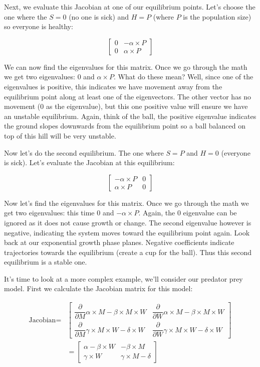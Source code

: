 \documentclass[]{memoir}
\begin{document}
Next, we evaluate this Jacobian at one of our equilibrium points. Let's
choose the one where the $S=0$ (no one is sick) and $H=P$ (where $P$ is
the population size) so everyone is healthy:

\[
\begin{bmatrix}
0 & -\alpha \times P \\
0 & \alpha \times P
\end{bmatrix}
\]

We can now find the eigenvalues for this matrix. Once we go through the
math we get two eigenvalues: 0 and $\alpha \times P$. What do these
mean? Well, since one of the eigenvalues is positive, this indicates we
have movement away from the equilibrium point along at least one of the
eigenvectors. The other vector has no movement (0 as the eigenvalue),
but this one positive value will ensure we have an unstable equilibrium.
Again, think of the ball, the positive eigenvalue indicates the ground
slopes downwards from the equilibrium point so a ball balanced on top of
this hill will be very unstable.

Now let's do the second equilibrium. The one where $S=P$ and $H=0$
(everyone is sick). Let's evaluate the Jacobian at this equilibrium:

\[
\begin{bmatrix}
-\alpha \times P & 0 \\
\alpha \times P & 0
\end{bmatrix}
\]

Now let's find the eigenvalues for this matrix. Once we go through the
math we get two eigenvalues: this time 0 and $-\alpha \times P$. Again,
the 0 eigenvalue can be ignored as it does not cause growth or change.
The second eigenvalue however is negative, indicating the system moves
toward the equilibrium point again. Look back at our exponential growth
phase planes. Negative coefficients indicate trajectories towards the
equilibrium (create a cup for the ball). Thus this second equilibrium is
a stable one.

It's time to look at a more complex example, we'll consider our predator
prey model. First we calculate the Jacobian matrix for this model:

\[
\begin{split}
\text{Jacobian} = & \begin{bmatrix} \dfrac{\partial}{\partial M }  \alpha \times M - \beta \times M \times W & \dfrac{\partial}{\partial W }  \alpha \times M - \beta \times M \times W  \\  \dfrac{\partial}{\partial M } \gamma \times M \times W - \delta \times W & \dfrac{\partial}{\partial W } \gamma \times M \times W - \delta \times W \end{bmatrix} \\
& = \begin{bmatrix}
\alpha - \beta \times W & -\beta \times M \\
\gamma \times W & \gamma \times M - \delta
\end{bmatrix}
\end{split}
\]
\end{document}

